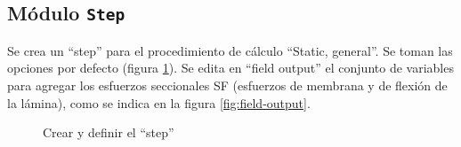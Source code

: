 \documentclass[spanish,a4paper,12pt]{article}
\begin{document}
\subsection{Módulo \texttt{Step}}

Se crea un ``step'' para el procedimiento de cálculo ``Static, general''. Se toman las opciones por defecto (figura \ref{fig:step}). 
Se edita en ``field output'' el conjunto de variables para agregar los esfuerzos seccionales SF (esfuerzos de membrana y de flexión de la lámina), como se indica en la
figura \ref{fig:field-output}.
\begin{figure}[h!tp]
\centering
{}
\caption{Crear y definir el ``step''}
\label{fig:step}
\end{figure}
\end{document}
